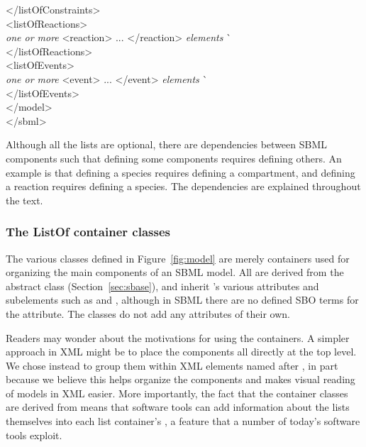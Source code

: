 \begin{tt}
\begin{tabbing}
\>\></listOfConstraints>\\
\>\><listOfReactions>\\
\>\>\>\textrm{\emph{one or more}} <reaction> ... </reaction> \textrm{\emph{elements}}  \` \sayOptional\\
\>\></listOfReactions>\\
\>\><listOfEvents>\\
\>\>\>\textrm{\emph{one or more}} <event> ... </event> \textrm{\emph{elements}}  \` \sayOptional\\
\>\></listOfEvents>\\
\></model>\\
</sbml>
\end{tabbing}
\regularspacing
\end{tt}
\vspace*{1ex}

Although all the lists are optional, there are dependencies
between SBML components such that defining some components
requires defining others.  An example is that defining a species
requires defining a compartment, and defining a reaction requires
defining a species.  The dependencies are explained throughout the
text.
  

\subsubsection{The ListOf container classes}
\label{sec:listof}
\label{sec:listofunitdefinitions}
\label{sec:listoffunctiondefinitions}
\label{sec:listofcompartments}
\label{sec:listofspecies}
\label{sec:listofparameters}
\label{sec:listofinitialassignments}
\label{sec:listofinitialassign}
\label{sec:listofrules}
\label{sec:listofconstraints}
\label{sec:listofreactions}
\label{sec:listofevents}

The various \ListOf classes defined in Figure~\ref{fig:model} are
merely containers used for organizing the main components of an
SBML model.  All are derived from the abstract class \SBase
(Section~\ref{sec:sbase}), and inherit \SBase's various attributes
and subelements such as  and ,
although in SBML \thisLVR there are no defined SBO terms for the
 attribute.  The \ListOf classes do not add any
attributes of their own.

Readers may wonder about the motivations for using the \ListOf
containers.  A simpler approach in XML might be to place the
components all directly at the top level.  We chose instead to
group them within XML elements named after
, in part because we believe this helps
organize the components and makes visual reading of
models in XML easier.  More importantly, the fact that
the container classes are derived from \SBase means that software
tools can add information about the lists themselves into each
list container's , a feature that a number of
today's software tools exploit.


